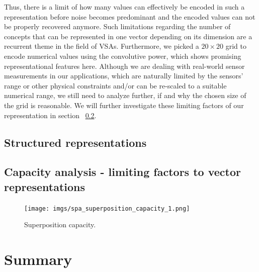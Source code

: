 Thus, there is a limit of how many values can effectively be encoded in such a representation before noise becomes predominant and the encoded values can not be properly recovered anymore.
Such limitations regarding the number of concepts that can be represented in one vector depending on its dimension are a recurrent theme in the field of \acp{VSA}. 
Furthermore, we picked a $20 \times 20$ grid to encode numerical values using the convolutive power, which shows promising representational features here.
Although we are dealing with real-world sensor measurements in our applications, which are naturally limited by the sensors' range or other physical constraints and/or can be re-scaled to a suitable numerical range, we still need to analyze further, if and why the chosen size of the grid is reasonable.
We will further investigate these limiting factors of our representation in section ~\ref{subsec:capacity_analysis_limitations_to_vector_representations}.

\subsection{Structured representations}%
\label{subsec:structured_representations}

\subsection{Capacity analysis - limiting factors to vector representations}%
\label{subsec:capacity_analysis_limitations_to_vector_representations}


\begin{figure}[t]
	\centering
	\texttt{[image: imgs/spa\_superposition\_capacity\_1.png]}
	\caption{Superposition capacity.}
	\label{fig:spa_superposition_capacity}
\end{figure}

\section{Summary}%
\label{sec:vector_representations_automotive_summary}


